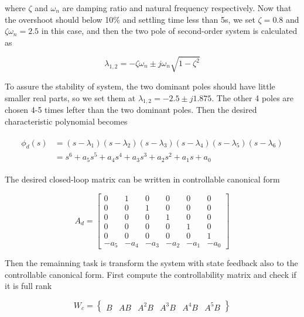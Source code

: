 \documentclass[hyperref]{article}
\theoremstyle{nonumberplain}
\begin{document}
	where $\zeta$ and $\omega_{n}$ are damping ratio and natural frequency respectively. Now that the overshoot should below 10\% and settling time less than 5s, we set $\zeta=0.8$ and $\zeta\omega_{n}=2.5$ in this case, and then the two pole of second-order system is calculated as
	
	\begin{equation}
	\lambda _{1,2}=-\zeta \omega _{n}\pm j\omega _{n}\sqrt{1-\zeta ^{2}}
	\label{eq7}
	\end{equation}
	
	To assure the stability of system, the two dominant poles should have little smaller real parts, so we set them at $\lambda_{1,2}=-2.5\pm j1.875$. The other 4 poles are chosen 4-5 times lefter than the two dominant poles. Then the desired characteristic polynomial becomes
	
	\begin{equation}
	\begin{split}
	\begin{aligned}
		\phi _{d}(s)&=(s-\lambda _{1})(s-\lambda _{2})(s-\lambda _{3})(s-\lambda _{4})(s-\lambda _{5})(s-\lambda _{6})\\
		&=s^{6}+a_{5}s^{5}+a_{4}s^{4}+a_{3}s^{3}+a_{2}s^{2}+a_{1}s+a_{0}
	\end{aligned}
	\end{split}
	\label{eq8}
	\end{equation}
	
	The desired closed-loop matrix can be written in controllable canonical form
	
	\begin{equation}
	A_{d}=\begin{bmatrix}
	0 &  1&0  &0  &0  &0 \\ 
	0 &0  &1  &0  &0  &0 \\ 
	0 &0  &0  &1  &0  &0 \\ 
	0 &0  &0  &0  &1  &0 \\ 
	0 &0  &0  &0  &0  &1 \\ 
	-a_{5} &-a_{4}  &-a_{3}  & -a_{2} &-a_{1}  & -a_{0}
	\end{bmatrix}
	\label{eq9}
	\end{equation}
	
	Then the remainning task is transform the system with state feedback also to the controllable canonical form. First compute the controllability matrix and check if it is full rank
	
	\begin{equation}
	W_{c}=\begin{Bmatrix}
	B &AB  &A^{2}B  &A^{3}B &A^{4}B  & A^{5}B
	\end{Bmatrix}
	\label{eq10}
	\end{equation}
	
\end{document}
